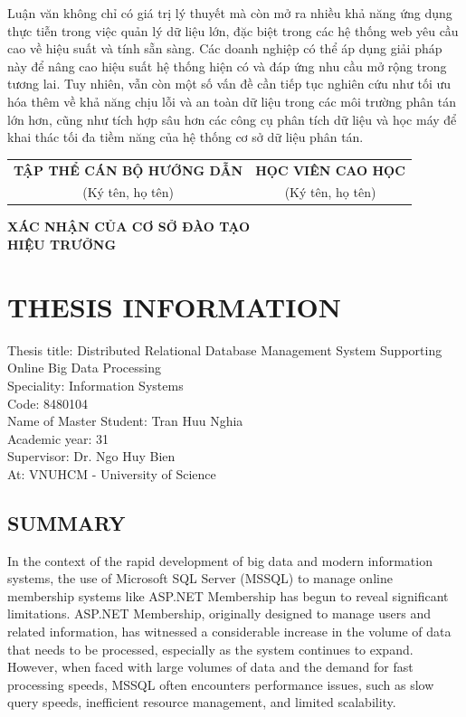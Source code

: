 \documentclass{article}[14pt]
\begin{document}
Luận văn không chỉ có giá trị lý thuyết mà còn mở ra nhiều khả năng ứng dụng thực tiễn trong việc quản lý dữ liệu lớn, đặc biệt trong các hệ thống web yêu cầu cao về hiệu suất và tính sẵn sàng. Các doanh nghiệp có thể áp dụng giải pháp này để nâng cao hiệu suất hệ thống hiện có và đáp ứng nhu cầu mở rộng trong tương lai. Tuy nhiên, vẫn còn một số vấn đề cần tiếp tục nghiên cứu như tối ưu hóa thêm về khả năng chịu lỗi và an toàn dữ liệu trong các môi trường phân tán lớn hơn, cũng như tích hợp sâu hơn các công cụ phân tích dữ liệu và học máy để khai thác tối đa tiềm năng của hệ thống cơ sở dữ liệu phân tán.

\begin{center}
    \begin{tabular}{c c}
        \textbf{TẬP THỂ CÁN BỘ HƯỚNG DẪN} & \textbf{HỌC VIÊN CAO HỌC} \\
        (Ký tên, họ tên) & (Ký tên, họ tên) \\
    \end{tabular}
    
    \vspace{3cm} %
    
    \textbf{XÁC NHẬN CỦA CƠ SỞ ĐÀO TẠO} \\
    \textbf{HIỆU TRƯỞNG}
\end{center}

\pagebreak

\section*{\centering \MakeUppercase{THESIS INFORMATION}}

Thesis title: Distributed Relational Database Management System
Supporting Online Big Data Processing\\
Speciality: Information Systems\\
Code: 8480104\\
Name of Master Student: Tran Huu Nghia\\
Academic year: 31\\
Supervisor: Dr. Ngo Huy Bien\\
At: VNUHCM - University of Science



\subsection{SUMMARY}
In the context of the rapid development of big data and modern information systems, the use of Microsoft SQL Server (MSSQL) to manage online membership systems like ASP.NET Membership has begun to reveal significant limitations. ASP.NET Membership, originally designed to manage users and related information, has witnessed a considerable increase in the volume of data that needs to be processed, especially as the system continues to expand. However, when faced with large volumes of data and the demand for fast processing speeds, MSSQL often encounters performance issues, such as slow query speeds, inefficient resource management, and limited scalability.
\end{document}
